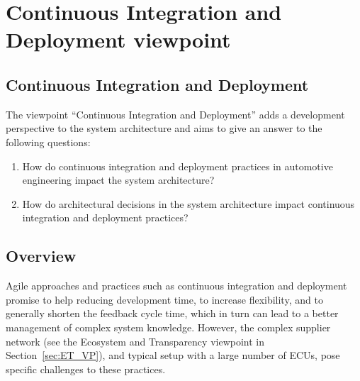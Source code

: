 
\section{Continuous Integration and Deployment viewpoint}\label{sec:CID_VP}
\renewcommand{\Fillin}[1]{{Continuous Integration and Deployment}}
\subsection{\Fillin{Viewpoint Name}}\label{vp:template}



The viewpoint ``Continuous Integration and Deployment'' adds a development perspective to the system %
architecture and aims to give an answer to the following questions:
\begin{enumerate}
\item How do continuous integration and deployment practices in automotive engineering impact the system architecture?
\item How do architectural decisions in the system architecture impact continuous integration and deployment practices?
\end{enumerate}

\subsection{Overview} 

Agile approaches and practices such as continuous integration and deployment promise to help reducing development time, to increase flexibility, and to generally shorten the feedback cycle time, which in turn can lead to a better management of complex system knowledge. 
However, the  complex supplier network (see the Ecosystem and Transparency viewpoint in Section~\ref{sec:ET_VP}),
and typical setup with a large number of ECUs,
pose specific challenges to %
these practices. %

